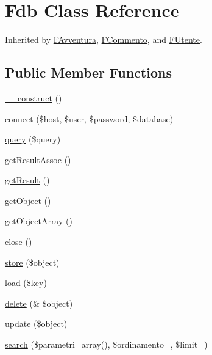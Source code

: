 \hypertarget{class_fdb}{}\section{Fdb Class Reference}
\label{class_fdb}


Inherited by \mbox{\hyperlink{class_f_avventura}{F\+Avventura}}, \mbox{\hyperlink{class_f_commento}{F\+Commento}}, and \mbox{\hyperlink{class_f_utente}{F\+Utente}}.

\subsection*{Public Member Functions}
\begin{DoxyCompactItemize}
\item 
\mbox{\hyperlink{class_fdb_a7d9667ce13aa13c0136744d8e21f5f45}{\+\_\+\+\_\+construct}} ()
\item 
\mbox{\hyperlink{class_fdb_a38c372cac419dbbe96cc4ee4bada7f21}{connect}} (\$host, \$user, \$password, \$database)
\item 
\mbox{\hyperlink{class_fdb_a088aea7a8a3eb0b8c0847f9c148ba0ea}{query}} (\$query)
\item 
\mbox{\hyperlink{class_fdb_a75e9d7f73285b64c4071d72f593ea8cf}{get\+Result\+Assoc}} ()
\item 
\mbox{\hyperlink{class_fdb_a6fcc3963a986e2c75a5573fd5fc29604}{get\+Result}} ()
\item 
\mbox{\hyperlink{class_fdb_abab2d548f08eb274802b87da3abc03fd}{get\+Object}} ()
\item 
\mbox{\hyperlink{class_fdb_ae08a72eb89fb8be9aab10ebc11e9434c}{get\+Object\+Array}} ()
\item 
\mbox{\hyperlink{class_fdb_a39d2934cd845934b97c4935cca62eaf5}{close}} ()
\item 
\mbox{\hyperlink{class_fdb_aecfa6b36d49bf256819ddd4c3f2f810c}{store}} (\$object)
\item 
\mbox{\hyperlink{class_fdb_ace44253c7a593943b41037f5b87ea304}{load}} (\$key)
\item 
\mbox{\hyperlink{class_fdb_ab682bb403956d8beca9258bba5f7d289}{delete}} (\& \$object)
\item 
\mbox{\hyperlink{class_fdb_a6a050a49b34bd44ed78258c661ef929d}{update}} (\$object)
\item 
\mbox{\hyperlink{class_fdb_af388fb9f8c07e9084b963a8c2f0b6ef4}{search}} (\$parametri=array(), \$ordinamento=\textquotesingle{}\textquotesingle{}, \$limit=\textquotesingle{}\textquotesingle{})
\end{DoxyCompactItemize}
